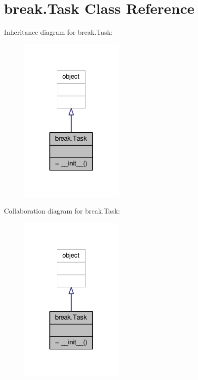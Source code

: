 \hypertarget{classbreak_1_1Task}{}\section{break.\+Task Class Reference}
\label{classbreak_1_1Task}


Inheritance diagram for break.\+Task\+:\nopagebreak
\begin{figure}[H]
\begin{center}
\leavevmode
\includegraphics[width=145pt]{classbreak_1_1Task__inherit__graph}
\end{center}
\end{figure}


Collaboration diagram for break.\+Task\+:\nopagebreak
\begin{figure}[H]
\begin{center}
\leavevmode
\includegraphics[width=145pt]{classbreak_1_1Task__coll__graph}
\end{center}
\end{figure}
